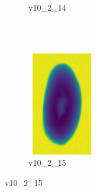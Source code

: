 \documentclass[11pt]{article}
\begin{document}
\begin{figure}
\begin{subfigure}[b]{0.15\textwidth}
         \caption{v10\_2\_14}
         \label{fig:y equals x}
     \end{subfigure}
    \\ \\
     \begin{subfigure}[b]{0.15\textwidth}
         \centering
         \includegraphics[width=3cm, height=4.5cm]{images/kartofler/v10_2_11_cut.png}
        \caption{v10\_2\_15}
         \label{fig:three sin x}
     \end{subfigure}
  \end{figure}




\newpage
\end{document}
